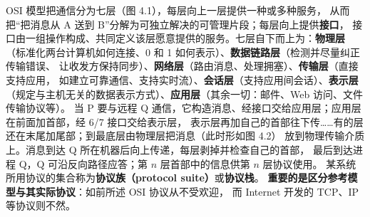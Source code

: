 \medskip\noindent OSI 模型把通信分为七层（图 4.1），每层向上一层提供一种或多种服务，
从而把“把消息从 A 送到 B”分解为可独立解决的可管理片段；每层向上提供\textbf{接口}，
接口由一组操作构成、共同定义该层愿意提供的服务。七层自下而上为：\textbf{物理层}
（标准化两台计算机如何连接、0 和 1 如何表示）、\textbf{数据链路层}（检测并尽量纠正传输错误、
让收发方保持同步）、\textbf{网络层}（路由消息、处理拥塞）、\textbf{传输层}（直接支持应用，
如建立可靠通信、支持实时流）、\textbf{会话层}（支持应用间会话）、\textbf{表示层}
（规定与主机无关的数据表示方式）、\textbf{应用层}（其余一切：邮件、Web 访问、文件传输协议等）。
当 P 要与远程 Q 通信，它构造消息、经接口交给应用层；应用层在前面加首部，经 6/7 接口交给表示层，
表示层再加自己的首部往下传……有的层还在末尾加尾部；到最底层由物理层把消息（此时形如图 4.2）
放到物理传输介质上。消息到达 Q 所在机器后向上传递，每层剥掉并检查自己的首部，
最后到达进程 Q，Q 可沿反向路径应答；第 $n$ 层首部中的信息供第 $n$ 层协议使用。
某系统所用协议的集合称为\textbf{协议族（protocol suite）}或\textbf{协议栈}。
\textbf{重要的是区分参考模型与其实际协议}：如前所述 OSI 协议从不受欢迎，
而 Internet 开发的 TCP、IP 等协议则不然。

